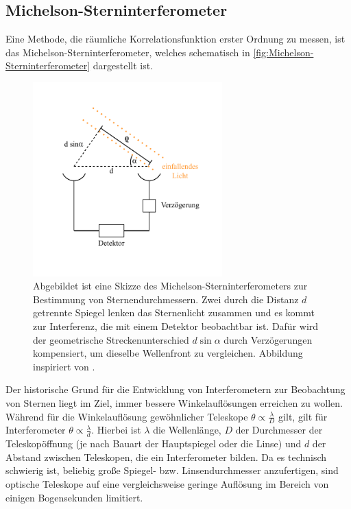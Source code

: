 \subsection{Michelson-Sterninterferometer}
\label{ssec:Michelson-Sterninterferometer}
Eine Methode, die räumliche Korrelationsfunktion erster Ordnung zu messen, ist das Michelson-Sterninterferometer, welches schematisch in \autoref{fig:Michelson-Sterninterferometer} dargestellt ist. 
\begin{figure}[h]
    \centering
    \includegraphics[width=0.65\textwidth]{images/Theorie/Michelson_Interferometer.pdf}
    \caption{Abgebildet ist eine Skizze des Michelson-Sterninterferometers zur Bestimmung von Sternendurchmessern. Zwei durch die Distanz $d$ getrennte Spiegel lenken das Sternenlicht zusammen und es kommt zur Interferenz, die mit einem Detektor beobachtbar ist. Dafür wird der geometrische Streckenunterschied $d\sin\alpha$ durch Verzögerungen kompensiert, um dieselbe Wellenfront zu vergleichen. Abbildung inspiriert von \cite[Abb. 1]{foellmiIntensityInterferometrySecondorder2009}.}
    \label{fig:Michelson-Sterninterferometer}
\end{figure}
Der historische Grund für die Entwicklung von Interferometern zur Beobachtung von Sternen liegt im Ziel, immer bessere Winkelauflösungen erreichen zu wollen. 
Während für die Winkelauflösung gewöhnlicher Teleskope $\theta \propto \frac{\lambda}{D}$ gilt, gilt für Interferometer $\theta \propto \frac{\lambda}{d}$. 
Hierbei ist $\lambda$ die Wellenlänge, $D$ der Durchmesser der Teleskopöffnung (je nach Bauart der Hauptspiegel oder die Linse) und $d$ der Abstand zwischen Teleskopen, die ein Interferometer bilden. 
Da es technisch schwierig ist, beliebig große Spiegel- bzw. Linsendurchmesser anzufertigen, sind optische Teleskope auf eine vergleichsweise geringe Auflösung im Bereich von einigen Bogensekunden limitiert. 
